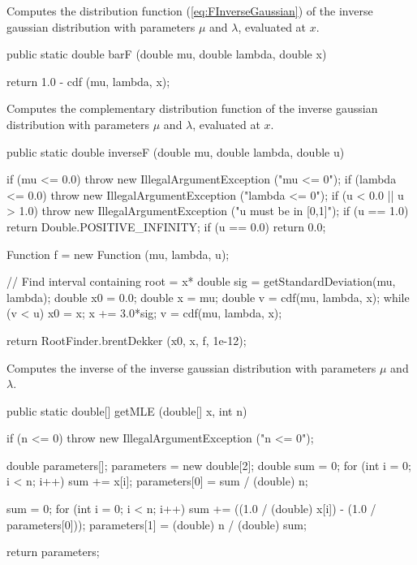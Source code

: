 \begin{tabb}
   Computes the distribution function (\ref{eq:FInverseGaussian})
   of the inverse gaussian distribution with parameters $\mu$ and
   $\lambda$, evaluated at $x$.
 \end{tabb}
\begin{code}
   
   public static double barF (double mu, double lambda, double x)\begin{hide} {
      return 1.0 - cdf (mu, lambda, x);
   }\end{hide}
\end{code}
\begin{tabb}
   Computes the complementary distribution function of the inverse gaussian distribution
   with parameters $\mu$ and $\lambda$, evaluated at $x$.
 \end{tabb}
\begin{code}
   
   public static double inverseF (double mu, double lambda, double u)\begin{hide} {
      if (mu <= 0.0)
         throw new IllegalArgumentException ("mu <= 0");
      if (lambda <= 0.0)
         throw new IllegalArgumentException ("lambda <= 0");
      if (u < 0.0 || u > 1.0)
         throw new IllegalArgumentException ("u must be in [0,1]");
      if (u == 1.0)
         return Double.POSITIVE_INFINITY;
      if (u == 0.0)
         return 0.0;

      Function f = new Function (mu, lambda, u);

      // Find interval containing root = x*
      double sig = getStandardDeviation(mu, lambda);
      double x0 = 0.0;
      double x = mu;
      double v = cdf(mu, lambda, x);
      while (v < u) {
         x0 = x;
         x += 3.0*sig;
         v = cdf(mu, lambda, x);
      }

      return RootFinder.brentDekker (x0, x, f, 1e-12);
   }\end{hide}
\end{code}
\begin{tabb}
   Computes the inverse of the inverse gaussian distribution
   with parameters $\mu$ and $\lambda$.
 \end{tabb}
\begin{code}

   public static double[] getMLE (double[] x, int n)\begin{hide} {
      if (n <= 0)
         throw new IllegalArgumentException ("n <= 0");

      double parameters[];
      parameters = new double[2];
      double sum = 0;
      for (int i = 0; i < n; i++) {
         sum += x[i];   
      }
      parameters[0] = sum / (double) n;

      sum = 0;
      for (int i = 0; i < n; i++) {
         sum += ((1.0 / (double) x[i]) - (1.0 / parameters[0]));
      }
      parameters[1] = (double) n / (double) sum;

      return parameters;
   }\end{hide}
\end{code}
